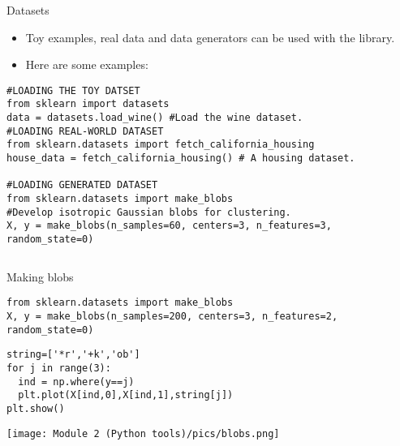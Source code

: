 \documentclass{beamer}
\begin{document}
\begin{frame}[fragile]{Datasets}
\begin{itemize}
    \item Toy examples, real data and data generators can be used with the library.
    \item Here are some examples:
\end{itemize}

\begin{lstlisting}
#LOADING THE TOY DATSET
from sklearn import datasets
data = datasets.load_wine() #Load the wine dataset.
#LOADING REAL-WORLD DATASET
from sklearn.datasets import fetch_california_housing
house_data = fetch_california_housing() # A housing dataset.

#LOADING GENERATED DATASET
from sklearn.datasets import make_blobs
#Develop isotropic Gaussian blobs for clustering.
X, y = make_blobs(n_samples=60, centers=3, n_features=3, random_state=0) 

\end{lstlisting}

\begin{verbatim}
\end{verbatim}
\end{frame}



\begin{frame}[fragile]{Making blobs}
\begin{lstlisting}
from sklearn.datasets import make_blobs
X, y = make_blobs(n_samples=200, centers=3, n_features=2, random_state=0) 
\end{lstlisting}

\begin{multicols}{2}

\begin{lstlisting}
string=['*r','+k','ob']
for j in range(3):
  ind = np.where(y==j)
  plt.plot(X[ind,0],X[ind,1],string[j])
plt.show()
\end{lstlisting}

\texttt{[image: Module 2 (Python tools)/pics/blobs.png]}

\end{multicols}

\end{frame}
\end{document}
